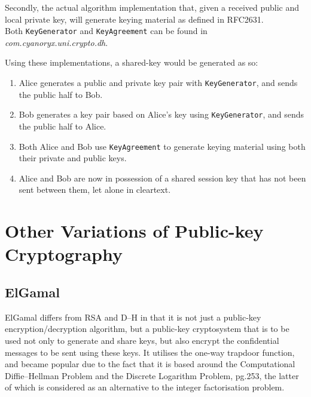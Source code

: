      
    
    Secondly, the actual algorithm implementation that, given a received public and local private key, will generate keying material as defined in RFC2631\cite{Rescorla:1999aa}. \\
    
    
    
    Both \verb!KeyGenerator! and \verb!KeyAgreement! can be found in \emph{com.cyanoryx.uni.crypto.dh}.
    
    Using these implementations, a shared-key would be generated as so:
    
    \begin{enumerate}
      \item Alice generates a public and private key pair with \verb!KeyGenerator!, and sends the public half to Bob.
      \item Bob generates a key pair based on Alice's key using \verb!KeyGenerator!, and sends the public half to Alice.
      \item Both Alice and Bob use \verb!KeyAgreement! to generate keying material using both their private and public keys.
      \item Alice and Bob are now in possession of a shared session key that has not been sent between them, let alone in cleartext.
    \end{enumerate}
  
\section{Other Variations of Public-key Cryptography}

  \subsection{ElGamal}
  
  ElGamal differs from RSA and D--H in that it is not just a public-key encryption/decryption algorithm, but a public-key cryptosystem that is to be used not only to generate and share keys, but also encrypt the confidential messages to be sent using these keys. It utilises the one-way trapdoor function, and became popular due to the fact that it is based around the Computational Diffie--Hellman Problem and the Discrete Logarithm Problem, \cite{Mao:2003uq} \textsection pg.253, the latter of which is considered as an alternative to the integer factorisation problem.
  
